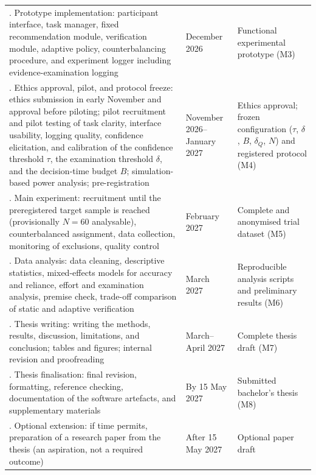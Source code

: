 \documentclass[oneside,final,14pt,a4paper]{extreport}
\begin{document}
\begin{longtable}{>{\raggedright\arraybackslash}p{7.4cm}>{\raggedright\arraybackslash}p{2.0cm}>{\raggedright\arraybackslash}p{5.2cm}}
4. Prototype implementation:
participant interface, task manager, fixed recommendation module, verification
module, adaptive policy, counterbalancing procedure, and experiment logger
including evidence-examination logging &
December 2026 &
Functional experimental prototype (M3) \\


5. Ethics approval, pilot, and protocol freeze:
ethics submission in early November and approval before piloting; pilot
recruitment and pilot testing of task clarity, interface usability, logging
quality, confidence elicitation, and calibration of the confidence threshold
$\tau$, the examination threshold $\delta$, and the decision-time budget $B$;
simulation-based power analysis; pre-registration &
November 2026--January 2027 &
Ethics approval; frozen configuration ($\tau$, $\delta$, $B$, $\delta_Q$, $N$)
and registered protocol (M4) \\


6. Main experiment:
recruitment until the preregistered target sample is reached
(provisionally $N=60$ analysable), counterbalanced assignment, data collection, monitoring
of exclusions, quality control &
February 2027 &
Complete and anonymised trial dataset (M5) \\


7. Data analysis:
data cleaning, descriptive statistics, mixed-effects models for accuracy and
reliance, effort and examination analysis, premise check, trade-off
comparison of static and adaptive verification &
March 2027 &
Reproducible analysis scripts and preliminary results (M6) \\


8. Thesis writing:
writing the methods, results, discussion, limitations, and conclusion;
tables and figures; internal revision and proofreading &
March--April 2027 &
Complete thesis draft (M7) \\


9. Thesis finalisation:
final revision, formatting, reference checking, documentation of the software
artefacts, and supplementary materials &
By 15 May 2027 &
Submitted bachelor's thesis (M8) \\


10. Optional extension:
if time permits, preparation of a research paper from the thesis (an
aspiration, not a required outcome) &
After 15 May 2027 &
Optional paper draft \\


\end{longtable}
\normalsize
\end{document}
